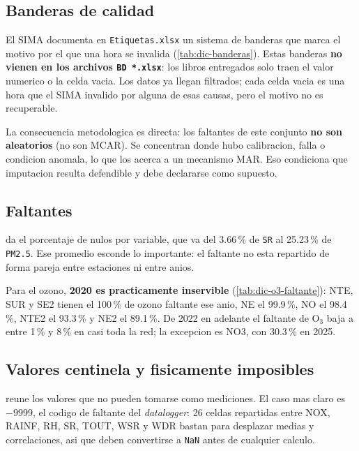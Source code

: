 \subsection{Banderas de calidad}\label{sec:dic:banderas}

El SIMA documenta en \texttt{Etiquetas.xlsx} un sistema de banderas que marca
el motivo por el que una hora se invalida (\cref{tab:dic-banderas}). Estas
banderas \textbf{no vienen en los archivos \texttt{BD *.xlsx}}: los libros
entregados solo traen el valor numerico o la celda vacia. Los datos ya llegan
filtrados; cada celda vacia es una hora que el SIMA invalido por alguna de esas
causas, pero el motivo no es recuperable.

La consecuencia metodologica es directa: los faltantes de este conjunto
\textbf{no son aleatorios} (no son MCAR). Se concentran donde hubo calibracion,
falla o condicion anomala, lo que los acerca a un mecanismo MAR. Eso condiciona
que imputacion resulta defendible y debe declararse como supuesto.

\subsection{Faltantes}\label{sec:dic:faltantes}

 da el porcentaje de nulos por variable, que va del
3.66\,\% de \texttt{SR} al 25.23\,\% de \texttt{PM2.5}. Ese promedio esconde lo
importante: el faltante no esta repartido de forma pareja entre estaciones ni
entre anios.

Para el ozono, \textbf{2020 es practicamente inservible}
(\cref{tab:dic-o3-faltante}): NTE, SUR y SE2 tienen el 100\,\% de ozono
faltante ese anio, NE el 99.9\,\%, NO el 98.4\,\%, NTE2 el 93.3\,\% y NE2 el
89.1\,\%. De 2022 en adelante el faltante de O$_3$ baja a entre 1\,\% y 8\,\%
en casi toda la red; la excepcion es NO3, con 30.3\,\% en 2025.

\subsection{Valores centinela y fisicamente imposibles}\label{sec:dic:centinela}

 reune los valores que no pueden tomarse como
mediciones. El caso mas claro es $-9999$, el codigo de faltante del
\emph{datalogger}: 26 celdas repartidas entre NOX, RAINF, RH, SR, TOUT, WSR y
WDR bastan para desplazar medias y correlaciones, asi que deben convertirse a
\texttt{NaN} antes de cualquier calculo.

